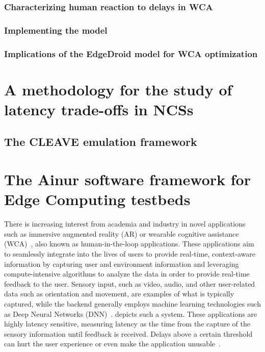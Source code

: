 \subsubsection{Characterizing human reaction to delays in \ac{WCA}}

\subsubsection{Implementing the model}

\subsubsection{Implications of the EdgeDroid model for \ac{WCA} optimization}

\section{A methodology for the study of latency trade-offs in \acsp{NCS}}

\subsection{The CLEAVE emulation framework}

\section{The Ainur software framework for Edge Computing testbeds}


There is increasing interest from academia and industry in novel applications such as immersive augmented reality (AR) or wearable cognitive assistance (WCA)~\cite{Chatzopoulos:Hyperion,Ha:TowardsWearableCogAssist}, also known as human-in-the-loop applications.
These applications aim to seamlessly integrate into the lives of users to provide real-time, context-aware information by capturing user and environment information and leveraging compute-intensive algorithms to analyze the data in order to provide real-time feedback to the user.
Sensory input, such as video, audio, and other user-related data such as orientation and movement, are examples of what is typically captured, while the backend generally employs machine learning technologies such as Deep Neural Networks (DNN)~\cite{Ha:TowardsWearableCogAssist}.
 depicts such a system.
These applications are highly latency sensitive, measuring latency as the time from the capture of the sensory information until feedback is received.
Delays above a certain threshold can hurt the user experience or even make the application unusable~\cite{Chen:AnEmpiricalStudyOfLatency}.


